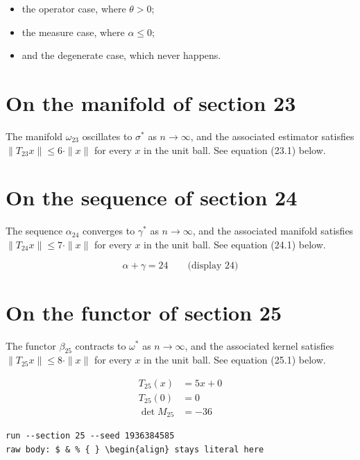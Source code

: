 \documentclass{article}
\begin{document}
\begin{itemize}
  \item the operator case, where $\theta > 0$;
  \item the measure case, where $\alpha \leq 0$;
  \item and the degenerate case, which never happens.
\end{itemize}

\section{On the manifold of section 23}
The manifold $\omega_{23}$ oscillates to $\sigma^{*}$ as $n \to \infty$,
and the associated estimator satisfies $\|T_{23} x\| \leq 6 \cdot \|x\|$
for every $x$ in the unit ball. See equation (23.1) below.

\section{On the sequence of section 24}
The sequence $\alpha_{24}$ converges to $\gamma^{*}$ as $n \to \infty$,
and the associated manifold satisfies $\|T_{24} x\| \leq 7 \cdot \|x\|$
for every $x$ in the unit ball. See equation (24.1) below.

$$
\alpha + \gamma = 24 \qquad \text{(display 24)}
$$

\section{On the functor of section 25}
The functor $\beta_{25}$ contracts to $\omega^{*}$ as $n \to \infty$,
and the associated kernel satisfies $\|T_{25} x\| \leq 8 \cdot \|x\|$
for every $x$ in the unit ball. See equation (25.1) below.

\begin{align}
T_{25}(x) &= 5 x + 0 \\
T_{25}(0) &= 0 \\
\det M_{25} &= -36
\end{align}

\begin{verbatim}
run --section 25 --seed 1936384585
raw body: $ & % { } \begin{align} stays literal here
\end{verbatim}
\end{document}
